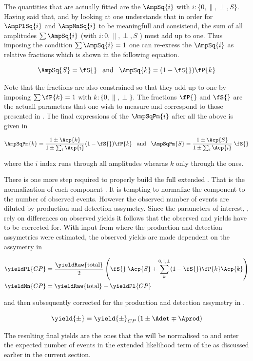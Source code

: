 The quantities that are actually fitted are the $\AmpSq{i}$ with $i:\{0,\parallel,\perp,S\}$. Having said that, and by looking at 
one understands that in order for $\AmpPlSq{i}$ and $\AmpMnSq{i}$ to be meaningfull and consistend, the sum of all amplitudes $\sum\AmpSq{i}$ 
(with $i:{0,\parallel,\perp,S}$ ) must add up to one. Thus imposing the condition $\sum\AmpSq{i} = 1$ one can re-exress the $\AmpSq{i}$
as relative fractions which is shown in the following equation.

\begin{equation}
\AmpSq{S} = \fS{} \;\;\;\text{and}\;\;\; \AmpSq{k} = (1-\fS{})\fP{k}
\label{amps_param}
\end{equation}

Note that the \pwave fractions are also constrained so that they add up to one by imposing $\sum\fP{k}=1$ with $k:\{0,\parallel,\perp\}$.
The fractions $\fP{}$ and $\fS{}$ are the actuall parameters that one wish to measure and correspond to those presented in \secref{}.
The final expressions of the $\AmpSqPm{i}$ after all the above is given in 

\begin{equation}
\AmpSqPm{k} = \frac{1\pm\Acp{k}}{1\pm\sum_i\Acp{i}}  (1-\fS{})\fP{k}  \;\;\; \text{and}\;\;\; \AmpSqPm{S} = \frac{1\pm\Acp{S}}{1\pm\sum_i\Acp{i}} \; \fS{}
\label{amps_final}
\end{equation}

\noindent where the $i$ index runs through all amplitudes whearas $k$ only through the \pwave ones.

There is one more step required to properly build the full extended \pdf. That is the normalization of each component \pdf. It is tempting to 
normalize the component \pdfs to the number of observed events. However the observed number of events are diluted by production and detection
assymetry. Since the parameters of interest, \ACP, rely on differences on observed yields it follows that the observed \BsbarJpsiKst and \BsJpsiKst 
yields have to be corrected for. With input from  where the production and detection assymetries were estimated, the 
observed yields are made dependent on the \ACP assymetry in  

\begin{align}
\yieldPl{CP} &= \frac{ \yieldRaw{\text{total}} }{2} \left( \fS{}\; \Acp{S} + \sum_k^{0,\parallel,\perp} (1-\fS{})\fP{k}\Acp{k}  \right) \nonumber \\
\yieldMn{CP} &=  \yieldRaw{\text{total}} - \yieldPl{CP} 
\label{acp_yields}
\end{align}

\noindent and then subsequently corrected for the production and detection assymetry in . 

\begin{equation}
\yield{\pm} = \yield{\pm}_{CP}  \left( 1 \pm \Adet \mp \Aprod \right)
\label{norm_yields}
\end{equation}

The resulting final yields are the ones that the \pdfs will be normalised to and enter the expected number of events in the extended likelihood term 
of the \pdfs as discussed earlier in the current section. 
